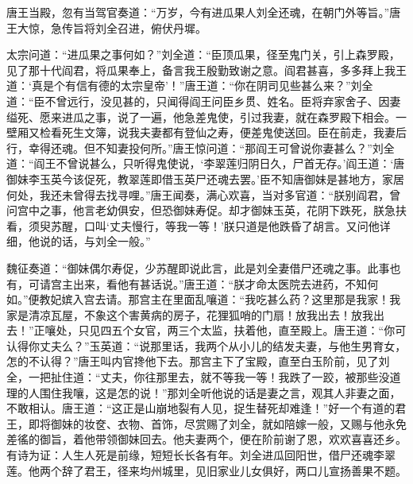 \documentclass[12pt]{lsbook}
\begin{document}
唐王当殿，忽有当驾官奏道：“万岁，今有进瓜果人刘全还魂，在朝门外等旨。”唐王大惊，急传旨将刘全召进，俯伏丹墀。

太宗问道：“进瓜果之事何如？”刘全道：“臣顶瓜果，径至鬼门关，引上森罗殿，见了那十代阎君，将瓜果奉上，备言我王殷勤致谢之意。阎君甚喜，多多拜上我王道：‘真是个有信有德的太宗皇帝’！”唐王道：“你在阴司见些甚么来？”刘全道：“臣不曾远行，没见甚的，只闻得阎王问臣乡贯、姓名。臣将弃家舍子、因妻缢死、愿来进瓜之事，说了一遍，他急差鬼使，引过我妻，就在森罗殿下相会。一壁厢又检看死生文簿，说我夫妻都有登仙之寿，便差鬼使送回。臣在前走，我妻后行，幸得还魂。但不知妻投何所。”唐王惊问道：“那阎王可曾说你妻甚么？”刘全道：“阎王不曾说甚么，只听得鬼使说，‘李翠莲归阴日久，尸首无存。’阎王道：‘唐御妹李玉英今该促死，教翠莲即借玉英尸还魂去罢。’臣不知唐御妹是甚地方，家居何处，我还未曾得去找寻哩。”唐王闻奏，满心欢喜，当对多官道：“朕别阎君，曾问宫中之事，他言老幼俱安，但恐御妹寿促。却才御妹玉英，花阴下跌死，朕急扶看，须臾苏醒，口叫‘丈夫慢行，等我一等！’朕只道是他跌昏了胡言。又问他详细，他说的话，与刘全一般。”

魏征奏道：“御妹偶尔寿促，少苏醒即说此言，此是刘全妻借尸还魂之事。此事也有，可请宫主出来，看他有甚话说。”唐王道：“朕才命太医院去进药，不知何如。”便教妃嫔入宫去请。那宫主在里面乱嚷道：“我吃甚么药？这里那是我家！我家是清凉瓦屋，不象这个害黄病的房子，花狸狐哨的门扇！放我出去！放我出去！”正嚷处，只见四五个女官，两三个太监，扶着他，直至殿上。唐王道：“你可认得你丈夫么？”玉英道：“说那里话，我两个从小儿的结发夫妻，与他生男育女，怎的不认得？”唐王叫内官搀他下去。那宫主下了宝殿，直至白玉阶前，见了刘全，一把扯住道：“丈夫，你往那里去，就不等我一等！我跌了一跤，被那些没道理的人围住我嚷，这是怎的说！”那刘全听他说的话是妻之言，观其人非妻之面，不敢相认。唐王道：“这正是山崩地裂有人见，捉生替死却难逢！”好一个有道的君王，即将御妹的妆奁、衣物、首饰，尽赏赐了刘全，就如陪嫁一般，又赐与他永免差徭的御旨，着他带领御妹回去。他夫妻两个，便在阶前谢了恩，欢欢喜喜还乡。有诗为证：人生人死是前缘，短短长长各有年。刘全进瓜回阳世，借尸还魂李翠莲。他两个辞了君王，径来均州城里，见旧家业儿女俱好，两口儿宣扬善果不题。
\end{document}
